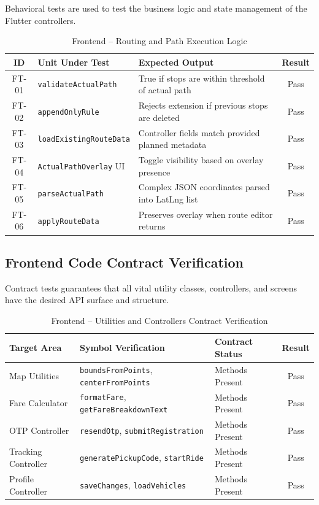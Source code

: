 Behavioral tests are used to test the business logic and state management of the Flutter controllers.

\begin{table}[H]
\centering
\caption{Frontend – Routing and Path Execution Logic}
\renewcommand{\arraystretch}{1.3}
\begin{tabularx}{\textwidth}{|c|X|X|c|}
\hline
\textbf{ID} & \textbf{Unit Under Test} & \textbf{Expected Output} & \textbf{Result} \\
\hline
FT-01 & \texttt{validateActualPath} & True if stops are within threshold of actual path & Pass \\
\hline
FT-02 & \texttt{appendOnlyRule} & Rejects extension if previous stops are deleted & Pass \\
\hline
FT-03 & \texttt{loadExistingRouteData} & Controller fields match provided planned metadata & Pass \\
\hline
FT-04 & \texttt{ActualPathOverlay} UI & Toggle visibility based on overlay presence & Pass \\
\hline
FT-05 & \texttt{parseActualPath} & Complex JSON coordinates parsed into LatLng list & Pass \\
\hline
FT-06 & \texttt{applyRouteData} & Preserves overlay when route editor returns & Pass \\
\hline
\end{tabularx}
\end{table}

\subsection{Frontend Code Contract Verification}

Contract tests guarantees that all vital utility classes, controllers, and screens have the desired API surface and structure.

\begin{table}[H]
\centering
\caption{Frontend – Utilities and Controllers Contract Verification}
\renewcommand{\arraystretch}{1.3}
\begin{tabularx}{\textwidth}{|l|X|X|c|}
\hline
\textbf{Target Area} & \textbf{Symbol Verification} & \textbf{Contract Status} & \textbf{Result} \\
\hline
Map Utilities & \texttt{boundsFromPoints}, \texttt{centerFromPoints} & Methods Present & Pass \\
\hline
Fare Calculator & \texttt{formatFare}, \texttt{getFareBreakdownText} & Methods Present & Pass \\
\hline
OTP Controller & \texttt{resendOtp}, \texttt{submitRegistration} & Methods Present & Pass \\
\hline
Tracking Controller & \texttt{generatePickupCode}, \texttt{startRide} & Methods Present & Pass \\
\hline
Profile Controller & \texttt{saveChanges}, \texttt{loadVehicles} & Methods Present & Pass \\
\hline
\end{tabularx}
\end{table}

